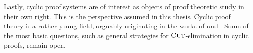 Lastly, cyclic proof systems are of interest as objects of proof theoretic study
in their own right. This is the perspective assumed in this thesis. Cyclic proof
theory is a rather young field, arguably originating in the works of
\textcite{niwinskiGamesMcalculus1996} and
\textcite{sprengerGlobalInductionMechanisms2003}. Some of the most basic
questions, such as general strategies for $\textsc{Cut}$-elimination in cyclic proofs,
remain open.


